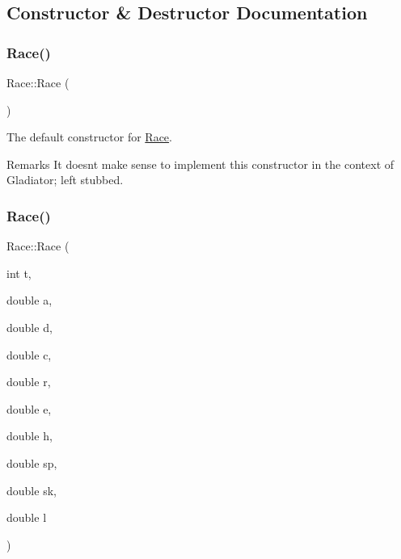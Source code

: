 \subsection{Constructor \& Destructor Documentation}
\mbox{\label{class_race_a351f212954e056cd030a7207934f1570}} 
\subsubsection{\texorpdfstring{Race()}{Race()}\hspace{0.1cm}{\footnotesize\ttfamily [1/2]}}
{\footnotesize\ttfamily Race\+::\+Race (\begin{DoxyParamCaption}{ }\end{DoxyParamCaption})}



The default constructor for \mbox{\hyperlink{class_race}{Race}}. 

\begin{DoxyRemark}{Remarks}
It doesn\textquotesingle{}t make sense to implement this constructor in the context of Gladiator; left stubbed. 
\end{DoxyRemark}
\mbox{\label{class_race_a9a9facf560a2d7d99db2035eb43a5705}} 
\subsubsection{\texorpdfstring{Race()}{Race()}\hspace{0.1cm}{\footnotesize\ttfamily [2/2]}}
{\footnotesize\ttfamily Race\+::\+Race (\begin{DoxyParamCaption}\item[{int}]{t,  }\item[{double}]{a,  }\item[{double}]{d,  }\item[{double}]{c,  }\item[{double}]{r,  }\item[{double}]{e,  }\item[{double}]{h,  }\item[{double}]{sp,  }\item[{double}]{sk,  }\item[{double}]{l }\end{DoxyParamCaption})}



